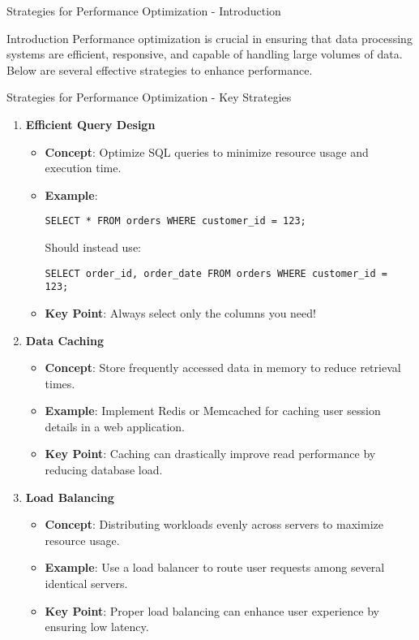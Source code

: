 \documentclass[aspectratio=169]{beamer}
\begin{document}
\begin{frame}[fragile]{Strategies for Performance Optimization - Introduction}
    \begin{block}{Introduction}
        Performance optimization is crucial in ensuring that data processing systems are efficient, responsive, and capable of handling large volumes of data. Below are several effective strategies to enhance performance.
    \end{block}
\end{frame}

\begin{frame}[fragile]{Strategies for Performance Optimization - Key Strategies}
    \begin{enumerate}
        \item \textbf{Efficient Query Design}
            \begin{itemize}
                \item \textbf{Concept}: Optimize SQL queries to minimize resource usage and execution time.
                \item \textbf{Example}:
                \begin{lstlisting}
SELECT * FROM orders WHERE customer_id = 123;
                \end{lstlisting}
                Should instead use:
                \begin{lstlisting}
SELECT order_id, order_date FROM orders WHERE customer_id = 123;
                \end{lstlisting}
                \item \textbf{Key Point}: Always select only the columns you need!
            \end{itemize}
        
        \item \textbf{Data Caching}
            \begin{itemize}
                \item \textbf{Concept}: Store frequently accessed data in memory to reduce retrieval times.
                \item \textbf{Example}: Implement Redis or Memcached for caching user session details in a web application.
                \item \textbf{Key Point}: Caching can drastically improve read performance by reducing database load.
            \end{itemize}
        
        \item \textbf{Load Balancing}
            \begin{itemize}
                \item \textbf{Concept}: Distributing workloads evenly across servers to maximize resource usage.
                \item \textbf{Example}: Use a load balancer to route user requests among several identical servers.
                \item \textbf{Key Point}: Proper load balancing can enhance user experience by ensuring low latency.
            \end{itemize}
    \end{enumerate}
\end{frame}
\end{document}
